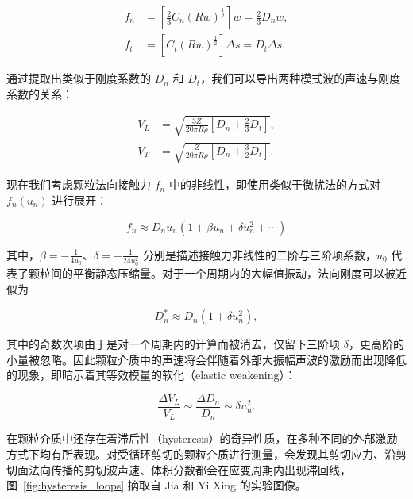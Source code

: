 \begin{align}
  f_{n} &= \left[\frac{2}{3}C_{n}(Rw)^{\frac{1}{2}}\right]w = \frac{2}{3}D_{n}w,\\
  f_{t} &= \left[C_{t}(Rw)^{\frac{1}{2}}\right]\Delta s = D_{t}\Delta s,
\end{align}

通过提取出类似于刚度系数的 $D_{n}$ 和 $D_{t}$，我们可以导出两种模式波的声速与刚度系数的关系\cite{doi.org/10.1029/GL010i011p01073}：

\begin{align}
  V_{L} &= \sqrt{\frac{3Z}{20\pi R\rho}\left[D_{n} + \frac{2}{3}D_{t}\right]},\\
  V_{T} &= \sqrt{\frac{ Z}{20\pi R\rho}\left[D_{n} + \frac{3}{2}D_{t}\right]}.
\end{align}

现在我们考虑颗粒法向接触力 $f_{n}$ 中的非线性，即使用类似于微扰法的方式对 $f_{n}(u_{n})$ 进行展开：

\begin{equation}
  f_{n} \approx D_{n}u_{n}\left(1 + \beta u_{n} + \delta u_{n}^{2} + \cdots\right)
\end{equation}

其中，$\beta = -\frac{1}{4u_{0}}$、$\delta = -\frac{1}{24u_{0}^{2}}$ 分别是描述接触力非线性的二阶与三阶项系数，$u_{0}$ 代表了颗粒间的平衡静态压缩量。对于一个周期内的大幅值振动，法向刚度可以被近似为

\begin{equation}
  D_{n}^{*} \approx D_{n}(1 + \delta u_{n}^{2}),
\end{equation}

其中的奇数次项由于是对一个周期内的计算而被消去，仅留下三阶项 $\delta$，更高阶的小量被忽略。因此颗粒介质中的声速将会伴随着外部大振幅声波的激励而出现降低的现象，即暗示着其等效模量的软化（elastic weakening）\cite{PhysRevE.84.020301}：

\begin{equation}
  \frac{\Delta V_{L}}{V_{L}} \sim \frac{\Delta D_{n}}{D_{n}}\sim \delta u_{n}^{2}.
\end{equation}

在颗粒介质中还存在着滞后性（hysteresis）的奇异性质，在多种不同的外部激励方式下均有所表现。对受循环剪切的颗粒介质进行测量，会发现其剪切应力、沿剪切面法向传播的剪切波声速、体积分数都会在应变周期内出现滞回线\cite{PhysRevE.85.051302,PhysRevLett.126.048002}，图~\ref{fig:hysteresis_loops} 摘取自 Jia 和 Yi Xing 的实验图像。


